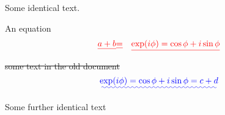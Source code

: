 \documentclass{article}
\providecommand{\DIFadd}[1]{{\protect\color{blue}\uwave{#1}}} %
\providecommand{\DIFdel}[1]{{\protect\color{red}\sout{#1}}}                      %
\providecommand{\DIFaddbegin}{} %
\providecommand{\DIFaddend}{} %
\providecommand{\DIFdelbegin}{} %
\providecommand{\DIFdelend}{} %
\begin{document}
Some identical text.

An equation
\DIFdelbegin \begin{eqnarray*}\DIFdel{
a + b }& \DIFdel{= }& \DIFdel{\exp(i\phi)=\cos \phi + i \sin \phi
}\end{eqnarray*}
\DIFdel{some text in the old document
}\DIFdelend \DIFaddbegin \begin{displaymath}\DIFadd{
\exp(i\phi)=\cos \phi + i \sin \phi = c + d
}\end{displaymath}
\DIFaddend 

Some further identical text
\end{document}
